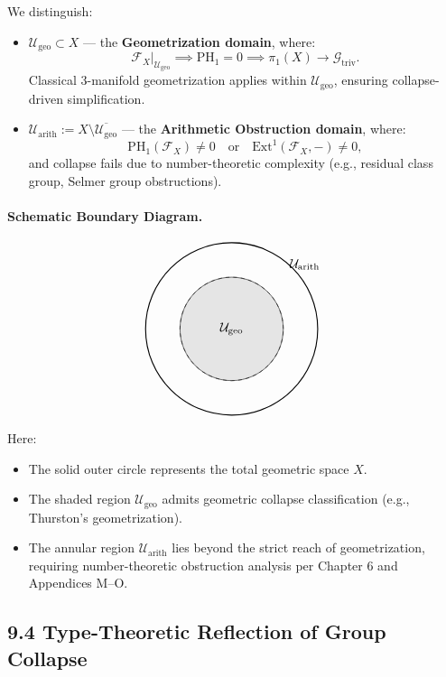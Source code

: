 \documentclass[11pt]{article}
\begin{document}
We distinguish:

\begin{itemize}
    \item \( \mathcal{U}_{\mathrm{geo}} \subset X \) — the \textbf{Geometrization domain}, where:
    \[
    \mathcal{F}_X|_{\mathcal{U}_{\mathrm{geo}}} \implies \mathrm{PH}_1 = 0 \implies \pi_1(X) \longrightarrow \mathcal{G}_{\mathrm{triv}}.
    \]
    Classical 3-manifold geometrization applies within \( \mathcal{U}_{\mathrm{geo}} \), ensuring collapse-driven simplification.

    \item \( \mathcal{U}_{\mathrm{arith}} := X \setminus \overline{\mathcal{U}_{\mathrm{geo}}} \) — the \textbf{Arithmetic Obstruction domain}, where:
    \[
    \mathrm{PH}_1(\mathcal{F}_X) \neq 0 \quad \text{or} \quad \mathrm{Ext}^1(\mathcal{F}_X, -) \neq 0,
    \]
    and collapse fails due to number-theoretic complexity (e.g., residual class group, Selmer group obstructions).
\end{itemize}

\paragraph{Schematic Boundary Diagram.}

\[
\begin{tikzpicture}[scale=1.2]
\draw[thick] (0,0) circle (2);
\draw[fill=gray!20] (0,0) circle (1.2);
\node at (0,0) {\( \mathcal{U}_{\mathrm{geo}} \)};
\node at (1.7,1.5) {\( \mathcal{U}_{\mathrm{arith}} \)};
\draw[dashed] (0,0) circle (1.2);
\end{tikzpicture}
\]

Here:

\begin{itemize}
    \item The solid outer circle represents the total geometric space \( X \).
    \item The shaded region \( \mathcal{U}_{\mathrm{geo}} \) admits geometric collapse classification (e.g., Thurston's geometrization).
    \item The annular region \( \mathcal{U}_{\mathrm{arith}} \) lies beyond the strict reach of geometrization, requiring number-theoretic obstruction analysis per Chapter 6 and Appendices M–O.
\end{itemize}

\subsection*{9.4 Type-Theoretic Reflection of Group Collapse}
\end{document}
